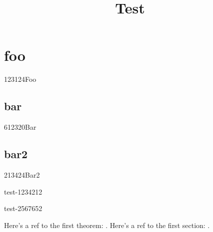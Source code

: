 \documentclass{report}
\begin{document}
\title{Test}


\chapter{foo}{123124}{Foo}

\section{bar}{612320}{Bar}
\lipsum[1]

\section{bar2}{213424}{Bar2}
\lipsum[1]

\begin{defn}[Baz]{test-1}{234212}
  \lipsum[1]
\end{defn}

\lipsum[1]

\begin{lem}[Baz2]{test-2}{567652}
  \lipsum[1]
\end{lem}

Here's a ref to the first theorem: .
Here's a ref to the first section: .
\end{document}
